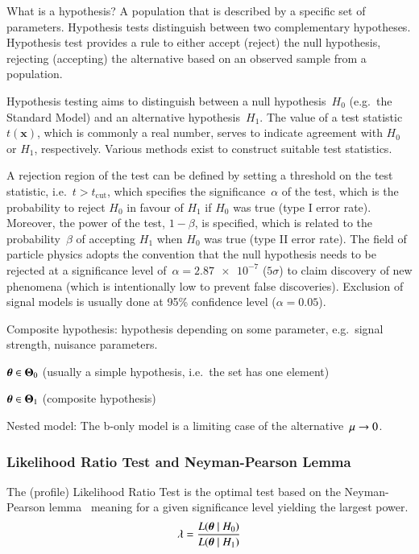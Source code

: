 What is a hypothesis? A population that is described by a specific set
of parameters. Hypothesis tests distinguish between two complementary
hypotheses. Hypothesis test provides a rule to either accept (reject)
the null hypothesis, rejecting (accepting) the alternative based on an
observed sample from a population.


Hypothesis testing aims to distinguish between a null hypothesis~$H_0$
(e.g.\ the Standard Model) and an alternative hypothesis~$H_1$. The
value of a test statistic~$t(\mathbf{x})$, which is commonly a real
number, serves to indicate agreement with $H_0$ or $H_1$,
respectively. Various methods exist to construct suitable test
statistics.

A rejection region of the test can be defined by setting a threshold
on the test statistic, i.e.\ $t > t_\text{cut}$, which specifies the
significance~$\alpha$ of the test, which is the probability to reject
$H_0$ in favour of $H_1$ if $H_0$ was true (type I error
rate). Moreover, the power of the test, $1 - \beta$, is specified,
which is related to the probability~$\beta$ of accepting $H_1$ when
$H_0$ was true (type II error rate). The field of particle physics
adopts the convention that the null hypothesis needs to be rejected at
a significance level of~$\alpha = \num{2.87e-7}$ ($5\sigma$) to claim
discovery of new phenomena (which is intentionally low to prevent
false discoveries). Exclusion of signal models is usually done at 95\%
confidence level ($\alpha = 0.05$).


Composite hypothesis: hypothesis depending on some parameter, e.g.\
signal strength, nuisance parameters.


$\boldtheta \in \boldsymbol{\Theta}_0$ (usually a simple hypothesis,
i.e.\ the set has one element)

$\boldtheta \in \boldsymbol{\Theta}_1$ (composite hypothesis)

Nested model: The b-only model is a limiting case of the
alternative~$\mu \rightarrow 0$.



\subsubsection{Likelihood Ratio Test and Neyman-Pearson Lemma}

The (profile) Likelihood Ratio Test is the optimal test based on the
Neyman-Pearson lemma~\cite{neyman1933} meaning for a given
significance level yielding the largest power.
\begin{align*}
  \lambda = \frac{L(\boldtheta \mid H_0)}{L(\boldtheta \mid H_1)}
\end{align*}


